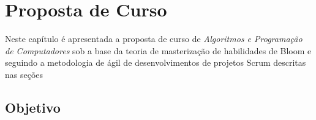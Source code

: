 

                      
\chapter{Proposta de Curso }\label{CapPropostaDeCurso}

Neste capítulo é apresentada a proposta de curso de \textit{Algoritmos e Programação de Computadores} sob a base da teoria de masterização de habilidades de Bloom e seguindo a metodologia de ágil de desenvolvimentos de projetos Scrum descritas nas seções



\section{Objetivo}




 

